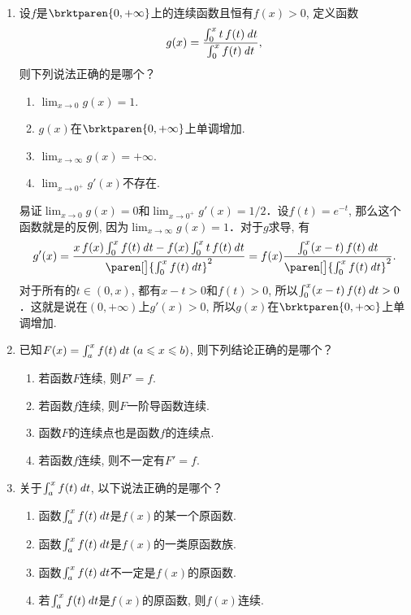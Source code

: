 \begin{enumerate}
\item 设\(f\)是\(\brktparen{0,+\infty}\)上的连续函数且恒有\(f(x) > 0\), 定义函数
  \[
    g(x) = \frac{\int_0^x t\,f(t) \mathop{}\!\mathit{d} t}{\int_0^x f(t) \mathop{}\!\mathit{d} t},
  \]
  则下列说法正确的是哪个？
  \begin{enumerate}
  \item \(\displaystyle \lim_{x\to0} g(x) = 1\).
  \item \(g(x)\)在\(\brktparen{0,+\infty}\)上单调增加.
  \item \(\displaystyle \lim_{x\to\infty} g(x) = +\infty\).
  \item \(\displaystyle \lim_{x\to0^+} g'(x)\)不存在.
  \end{enumerate}

  \ifshowsol
    易证\(\lim_{x\to0} g(x) = 0\)和\(\lim_{x\to0^+} g'(x) = 1/2\)．设\(f(t) = e^{-t}\), 那么这个函数就是的反例, 因为\(\lim_{x\to\infty} g(x) = 1\)．对于\(g\)求导, 有
    \[
      g'(x) = \frac{x\,f(x) \int_0^x f(t) \dt - f(x) \int_0^x t\,f(t) \dt}{\paren[\big]{\int_0^x f(t) \dt}^2}
      = f(x) \frac{\int_0^x (x-t)\,f(t) \dt}{\paren[\big]{\int_0^x f(t) \dt}^2}.
    \]
    对于所有的\(t \in (0, x)\), 都有\(x - t > 0\)和\(f(t) > 0\), 所以\(\int_0^x (x-t)\,f(t) \mathop{}\!\mathit{d} t > 0\)．这就是说在\((0,+\infty)\)上\(g'(x) > 0\), 所以\(g(x)\)在\(\brktparen{0,+\infty}\)上单调增加.
  \fi

\item 已知\(F(x) = \int_a^x f(t) \dt \; (a \le x \le b)\), 则下列结论正确的是哪个？
  \begin{enumerate}
  \item 若函数\(F\)连续, 则\(F' = f\).
  \item 若函数\(f\)连续, 则\(F\)一阶导函数连续.
  \item 函数\(F\)的连续点也是函数\(f\)的连续点.
  \item 若函数\(f\)连续, 则不一定有\(F' = f\).
  \end{enumerate}

\item 关于\(\int_a^x f(t) \mathop{}\!\mathit{d} t\), 以下说法正确的是哪个？
  \begin{enumerate}
  \item 函数\(\int_a^x f(t) \mathop{}\!\mathit{d} t\)是\(f(x)\)的某一个原函数.
  \item 函数\(\int_a^x f(t) \mathop{}\!\mathit{d} t\)是\(f(x)\)的一类原函数族.
  \item 函数\(\int_a^x f(t) \mathop{}\!\mathit{d} t\)不一定是\(f(x)\)的原函数.
  \item 若\(\int_a^x f(t) \mathop{}\!\mathit{d} t\)是\(f(x)\)的原函数, 则\(f(x)\)连续.
  \end{enumerate}


\end{enumerate}
